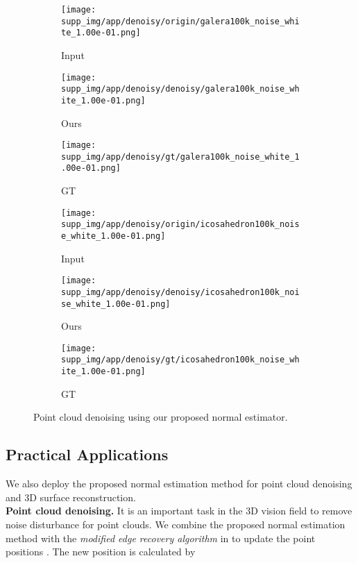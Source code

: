 \documentclass[runningheads]{llncs}
\begin{document}
\begin{figure}
	\begin{center}
	\begin{subfigure}{0.15\linewidth}
		\texttt{[image: supp\_img/app/denoisy/origin/galera100k\_noise\_white\_1.00e-01.png]}
		\caption{Input}
	\end{subfigure}
	\begin{subfigure}{0.15\linewidth }
		\texttt{[image: supp\_img/app/denoisy/denoisy/galera100k\_noise\_white\_1.00e-01.png]}
		\caption{Ours}
	\end{subfigure}
	\begin{subfigure}{0.15\linewidth}
		\texttt{[image: supp\_img/app/denoisy/gt/galera100k\_noise\_white\_1.00e-01.png]}
		\caption{GT}
	\end{subfigure}
	\begin{subfigure}{0.15\linewidth}
		\texttt{[image: supp\_img/app/denoisy/origin/icosahedron100k\_noise\_white\_1.00e-01.png]}
		\caption{Input}
	\end{subfigure}
	\begin{subfigure}{0.15\linewidth}
		\texttt{[image: supp\_img/app/denoisy/denoisy/icosahedron100k\_noise\_white\_1.00e-01.png]}
		\caption{Ours}
	\end{subfigure}
	\begin{subfigure}{0.15   \linewidth}
		\texttt{[image: supp\_img/app/denoisy/gt/icosahedron100k\_noise\_white\_1.00e-01.png]}
		\caption{GT}
	\end{subfigure}
	\caption{Point cloud denoising using our proposed normal estimator. 
	}
	\label{fig:denoisy}
	\end{center}
\end{figure}

\subsection{Practical Applications}
We also deploy the proposed normal estimation method for point cloud denoising and 3D surface reconstruction. 
\\
\noindent\textbf{Point cloud denoising.} It is an important task in the 3D vision field to remove noise disturbance for point clouds. We combine the proposed normal estimation method with the \emph{modified edge recovery algorithm} in \cite{lu2020low} to update the point positions . The new position  is 
calculated by
\end{document}
